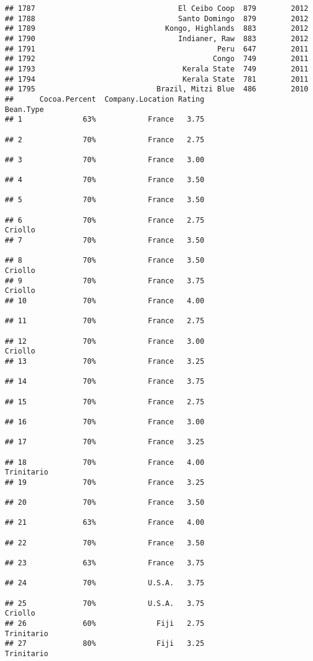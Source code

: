\documentclass[
]{article}
\begin{document}
\begin{verbatim}
## 1787                                 El Ceibo Coop  879        2012
## 1788                                 Santo Domingo  879        2012
## 1789                              Kongo, Highlands  883        2012
## 1790                                 Indianer, Raw  883        2012
## 1791                                          Peru  647        2011
## 1792                                         Congo  749        2011
## 1793                                  Kerala State  749        2011
## 1794                                  Kerala State  781        2011
## 1795                            Brazil, Mitzi Blue  486        2010
##      Cocoa.Percent  Company.Location Rating                Bean.Type
## 1              63%            France   3.75                         
## 2              70%            France   2.75                         
## 3              70%            France   3.00                         
## 4              70%            France   3.50                         
## 5              70%            France   3.50                         
## 6              70%            France   2.75                  Criollo
## 7              70%            France   3.50                         
## 8              70%            France   3.50                  Criollo
## 9              70%            France   3.75                  Criollo
## 10             70%            France   4.00                         
## 11             70%            France   2.75                         
## 12             70%            France   3.00                  Criollo
## 13             70%            France   3.25                         
## 14             70%            France   3.75                         
## 15             70%            France   2.75                         
## 16             70%            France   3.00                         
## 17             70%            France   3.25                         
## 18             70%            France   4.00               Trinitario
## 19             70%            France   3.25                         
## 20             70%            France   3.50                         
## 21             63%            France   4.00                         
## 22             70%            France   3.50                         
## 23             63%            France   3.75                         
## 24             70%            U.S.A.   3.75                         
## 25             70%            U.S.A.   3.75                  Criollo
## 26             60%              Fiji   2.75               Trinitario
## 27             80%              Fiji   3.25               Trinitario

\end{verbatim}
\end{document}
